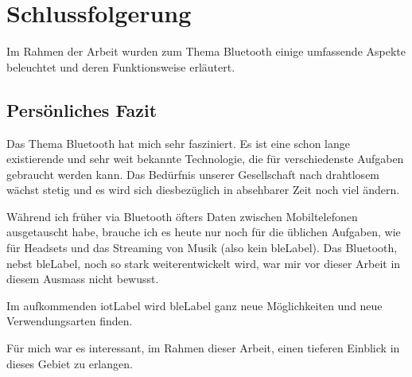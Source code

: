 \chapter{Schlussfolgerung}
Im Rahmen der Arbeit wurden zum Thema Bluetooth einige umfassende Aspekte beleuchtet und deren Funktionsweise erläutert.

\section{Persönliches Fazit}
Das Thema Bluetooth hat mich sehr fasziniert.
Es ist eine schon lange existierende und sehr weit bekannte Technologie, die für verschiedenste Aufgaben gebraucht werden kann.
Das Bedürfnis unserer Gesellschaft nach drahtlosem wächst stetig und es wird sich diesbezüglich in absehbarer Zeit noch viel ändern.

Während ich früher via Bluetooth öfters Daten zwischen Mobiltelefonen ausgetauscht habe, brauche ich es heute nur noch für die üblichen Aufgaben, wie für Headsets und das Streaming von Musik (also kein \gls{bleLabel}).
Das Bluetooth, nebst \gls{bleLabel}, noch so stark weiterentwickelt wird, war mir vor dieser Arbeit in diesem Ausmass nicht bewusst.

Im aufkommenden \gls{iotLabel} wird \gls{bleLabel} ganz neue Möglichkeiten und neue Verwendungsarten finden.

Für mich war es interessant, im Rahmen dieser Arbeit, einen tieferen Einblick in dieses Gebiet zu erlangen.
